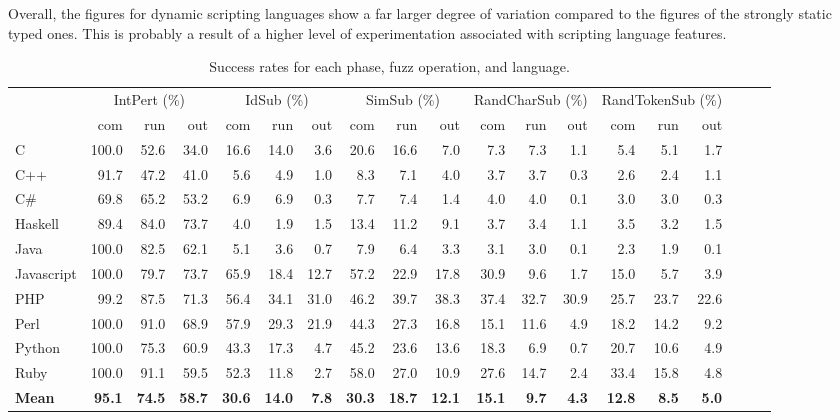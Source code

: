 \documentclass[10pt]{sigplanconf}
\begin{document}
Overall, the figures for dynamic scripting languages show a far larger
degree of variation compared to the figures of the strongly static typed
ones.
This is probably a result of a higher level of experimentation
associated with scripting language features.

\begin{table}
\begin{center}
\begin{tabular}{ l r r r r r r r r r r r r r r r r r r }
& \multicolumn{3}{c}{IntPert (\%)} & \multicolumn{3}{c}{IdSub (\%)} & \multicolumn{3}{c}{SimSub (\%)} & \multicolumn{3}{c}{RandCharSub (\%)} & \multicolumn{3}{c}{RandTokenSub (\%)}\\ 
	       & com  & run  & out  & com  & run  & out  & com  & run  & out  & com & run   & out  & com  & run  & out\\
\hline													
C & 100.0 & 52.6 & 34.0 & 16.6 & 14.0 & 3.6  & 20.6 & 16.6 & 7.0  & 7.3 & 7.3 & 1.1  & 5.4 & 5.1 & 1.7 \\
C++ & 91.7 & 47.2 & 41.0  & 5.6 & 4.9 & 1.0  & 8.3 & 7.1 & 4.0  & 3.7 & 3.7 & 0.3  & 2.6 & 2.4 & 1.1 \\
C\# & 69.8 & 65.2 & 53.2  & 6.9 & 6.9 & 0.3  & 7.7 & 7.4 & 1.4  & 4.0 & 4.0 & 0.1  & 3.0 & 3.0 & 0.3 \\
Haskell & 89.4 & 84.0 & 73.7  & 4.0 & 1.9 & 1.5  & 13.4 & 11.2 & 9.1  & 3.7 & 3.4 & 1.1  & 3.5 & 3.2 & 1.5 \\
Java & 100.0 & 82.5 & 62.1  & 5.1 & 3.6 & 0.7  & 7.9 & 6.4 & 3.3  & 3.1 & 3.0 & 0.1  & 2.3 & 1.9 & 0.1 \\
Javascript & 100.0 & 79.7 & 73.7  & 65.9 & 18.4 & 12.7  & 57.2 & 22.9 & 17.8  & 30.9 & 9.6 & 1.7  & 15.0 & 5.7 & 3.9 \\
PHP & 99.2 & 87.5 & 71.3  & 56.4 & 34.1 & 31.0  & 46.2 & 39.7 & 38.3  & 37.4 & 32.7 & 30.9  & 25.7 & 23.7 & 22.6 \\
Perl & 100.0 & 91.0 & 68.9  & 57.9 & 29.3 & 21.9  & 44.3 & 27.3 & 16.8  & 15.1 & 11.6 & 4.9  & 18.2 & 14.2 & 9.2 \\
Python & 100.0 & 75.3 & 60.9  & 43.3 & 17.3 & 4.7  & 45.2 & 23.6 & 13.6  & 18.3 & 6.9 & 0.7  & 20.7 & 10.6 & 4.9 \\
Ruby & 100.0 & 91.1 & 59.5  & 52.3 & 11.8 & 2.7  & 58.0 & 27.0 & 10.9  & 27.6 & 14.7 & 2.4  & 33.4 & 15.8 & 4.8 \\
\hline
\textbf{Mean} & \textbf{95.1} & \textbf{74.5} & \textbf{58.7}  & \textbf{30.6} & \textbf{14.0} & \textbf{7.8}  & \textbf{30.3} & \textbf{18.7} & \textbf{12.1}  & \textbf{15.1} & \textbf{9.7} & \textbf{4.3}  & \textbf{12.8} & \textbf{8.5} & \textbf{5.0} \\
\end{tabular}
\end{center}
\caption{Success rates for each phase, fuzz operation, and language.}
\label{tbl:aggregated-per-language}
\end{table}
\end{document}
